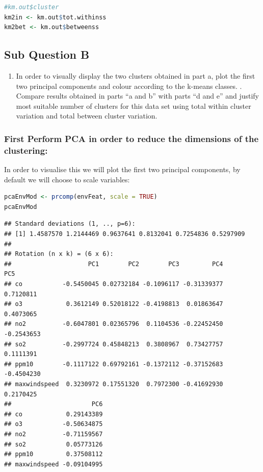 \documentclass[
]{article}
\providecommand{\tightlist}{%
  \setlength{\itemsep}{0pt}\setlength{\parskip}{0pt}}
\begin{document}
\begin{lstlisting}[language=R]
#km.out$cluster
km2in <- km.out$tot.withinss
km2bet <- km.out$betweenss
\end{lstlisting}

\hypertarget{sub-question-b}{%
\subsection{Sub Question B}\label{sub-question-b}}

\begin{enumerate}
\def\labelenumi{\alph{enumi}.}
\setcounter{enumi}{1}
\tightlist
\item
  In order to visually display the two clusters obtained in part a, plot
  the first two principal components and colour according to the k-means
  classes. . Compare results obtained in parts ``a and b'' with parts
  ``d and e'' and justify most suitable number of clusters for this data
  set using total within cluster variation and total between cluster
  variation.
\end{enumerate}

\hypertarget{first-perform-pca-in-order-to-reduce-the-dimensions-of-the-clustering}{%
\subsubsection{First Perform PCA in order to reduce the dimensions of
the
clustering:}\label{first-perform-pca-in-order-to-reduce-the-dimensions-of-the-clustering}}

In order to visualise this we will plot the first two principal
components, by default we will choose to scale variables:

\begin{lstlisting}[language=R]
pcaEnvMod <- prcomp(envFeat, scale = TRUE)
pcaEnvMod
\end{lstlisting}

\begin{lstlisting}
## Standard deviations (1, .., p=6):
## [1] 1.4587570 1.2144469 0.9637641 0.8132041 0.7254836 0.5297909
## 
## Rotation (n x k) = (6 x 6):
##                     PC1        PC2        PC3         PC4        PC5
## co           -0.5450045 0.02732184 -0.1096117 -0.31339377  0.7120811
## o3            0.3612149 0.52018122 -0.4198813  0.01863647  0.4073065
## no2          -0.6047801 0.02365796  0.1104536 -0.22452450 -0.2543653
## so2          -0.2997724 0.45848213  0.3808967  0.73427757  0.1111391
## ppm10        -0.1117122 0.69792161 -0.1372112 -0.37152683 -0.4504230
## maxwindspeed  0.3230972 0.17551320  0.7972300 -0.41692930  0.2170425
##                      PC6
## co            0.29143389
## o3           -0.50634875
## no2          -0.71159567
## so2           0.05773126
## ppm10         0.37508112
## maxwindspeed -0.09104995
\end{lstlisting}
\end{document}
